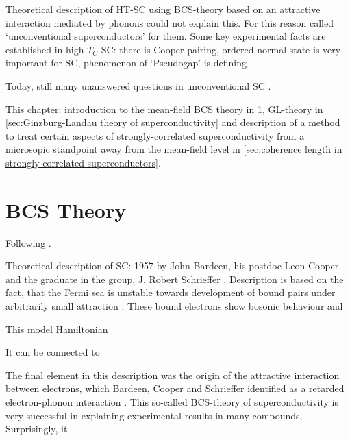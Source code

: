 \documentclass[../notes.tex]{subfiles}
\begin{document}
Theoretical description of HT-SC using BCS-theory based on an attractive interaction mediated by phonons could not explain this.
For this reason called `unconventional superconductors' for them.
Some key experimental facts are established in high \(T_C\) SC: there is Cooper pairing, ordered normal state is very important for SC, phenomenon of `Pseudogap' is defining \cite{yanaseTheorySuperconductivityStrongly2003}.


Today, still many unanswered questions in unconventional SC \cite{zhouHightemperatureSuperconductivity2021}.



This chapter: introduction to the mean-field BCS theory in \cref{sec:bcs-theory}, GL-theory in \cref{sec:Ginzburg-Landau theory of superconductivity} and description of a method to treat certain aspects of strongly-correlated superconductivity from a microsopic standpoint away from the mean-field level in \cref{sec:coherence length in strongly correlated superconductors}.

\section{BCS Theory}\label{sec:bcs-theory}

Following \cite[ch. 14]{colemanIntroductionManyBodyPhysics2015}.

Theoretical description of SC: 1957 by John Bardeen, his postdoc Leon Cooper and the graduate in the group, J. Robert Schrieffer \cite{bardeenTheorySuperconductivity1957}.
Description is based on the fact, that the Fermi sea is unstable towards development of bound pairs under arbitrarily small attraction \cite{cooperBoundElectronPairs1956}.
These bound electrons show bosonic behaviour and 

This model Hamiltonian

It can be connected to 

The final element in this description was the origin of the attractive interaction between electrons, which Bardeen, Cooper and Schrieffer identified as a retarded electron-phonon interaction \cite{bardeenTheorySuperconductivity1957}.
This so-called BCS-theory of superconductivity is very successful in explaining experimental results in many compounds, 
Surprisingly, it
\end{document}
